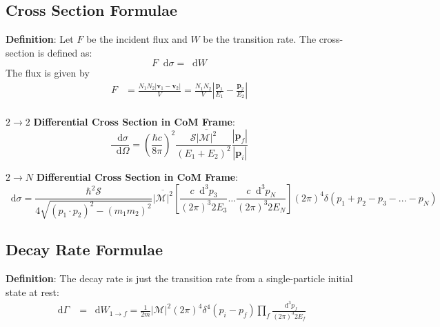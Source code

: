 \documentclass[12pt]{article}
\newcommand{\diff}{\mathop{}\!\mathrm{d}}
\theoremstyle{definition}
\begin{document}
\subsection{Cross Section Formulae}

\textbf{Definition}: Let $F$ be the incident flux and $W$ be the transition rate. The cross-section is 
defined as:
\begin{equation*}
    F \diff \sigma = \diff W
\end{equation*}
The flux is given by
\begin{equation*}
\begin{split}
    F
        &= \frac{N_1 N_2 |\bm{v}_1 - \bm{v}_2|}{V}
        = \frac{N_1 N_2}{V} \left| \frac{\bm{p}_1}{E_1} - \frac{\bm{p}_2}{E_2} \right| \\
\end{split}
\end{equation*}

$2 \to 2$ \textbf{Differential Cross Section in CoM Frame}:
\begin{equation*}
    \frac{\diff \sigma}{\diff \Omega} = \left( \frac{\hbar c}{8\pi} \right)^2 \frac{\mathcal{S} \overline{|\mathcal{M}|^2}}{(E_1 + E_2)^2} \frac{|\bm{p}_f|}{|\bm{p}_i|}
\end{equation*}

$2 \to N$ \textbf{Differential Cross Section in CoM Frame}:
\begin{equation*}
    \diff \sigma = \frac{\hbar^2 \mathcal{S}}{4 \sqrt{(p_1 \cdot p_2)^2 - (m_1 m_2)^2} } \overline{|\mathcal{M}|^2} \left[ \frac{c \diff^3 p_3}{(2\pi)^3 2E_3} \dots \frac{c \diff^3 p_N}{(2\pi)^3 2E_N} \right] (2\pi)^4 \delta(p_1 + p_2 - p_3 - ... - p_N)
\end{equation*}

\subsection{Decay Rate Formulae}

\textbf{Definition}: The decay rate is just the transition rate from a single-particle initial state at rest:
\begin{equation*}
\begin{split}
    \diff \Gamma
        &= \diff W_{1 \to f}
        = \frac{1}{2m} |\mathcal{M}|^2 (2\pi)^4 \delta^4(p_i - p_f) \prod_f \frac{\diff^3 p_f}{(2\pi)^3 2E_f} \\
\end{split}
\end{equation*}
\end{document}
